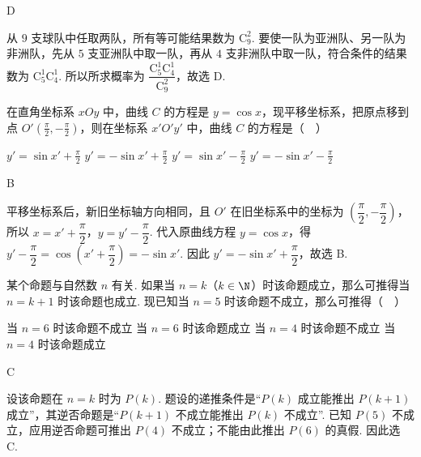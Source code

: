\begin{answer}
D
\end{answer}

\begin{solution}
从 \(9\) 支球队中任取两队，所有等可能结果数为 \(\mathrm C_9^2\). 要使一队为亚洲队、另一队为非洲队，先从 \(5\) 支亚洲队中取一队，再从 \(4\) 支非洲队中取一队，符合条件的结果数为 \(\mathrm C_5^1\mathrm C_4^1\). 所以所求概率为
\(\dfrac{\mathrm C_5^1\mathrm C_4^1}{\mathrm C_9^2}\)，故选 D.
\end{solution}

\begin{problem}
在直角坐标系 \(xOy\) 中，曲线 \(C\) 的方程是 \(y = \cos x\)，现平移坐标系，把原点移到点 \(O' \left(\frac{\pi}{2}, -\frac{\pi}{2} \right)\)，则在坐标系 \(x'O'y'\) 中，曲线 \(C\) 的方程是（\(\quad\)）

\choices
    {\(y' = \sin x' + \frac{\pi}{2} \)}
    {\(y' = -\sin x' + \frac{\pi}{2} \)}
    {\(y' = \sin x' - \frac{\pi}{2} \)}
    {\(y' = -\sin x' - \frac{\pi}{2} \)}
\end{problem}

\begin{answer}
B
\end{answer}

\begin{solution}
平移坐标系后，新旧坐标轴方向相同，且 \(O'\) 在旧坐标系中的坐标为 \(\left(\dfrac\pi2,-\dfrac\pi2\right)\)，所以
\(x=x'+\dfrac\pi2\)，\(y=y'-\dfrac\pi2\). 代入原曲线方程 \(y=\cos x\)，得
\(y'-\dfrac\pi2=\cos\left(x'+\dfrac\pi2\right)=-\sin x'\). 因此 \(y'=-\sin x'+\dfrac\pi2\)，故选 B.
\end{solution}

\begin{problem}
某个命题与自然数 \(n\) 有关. 如果当 \(n = k\)（\(k \in \N\)）时该命题成立，那么可推得当 \(n = k + 1\) 时该命题也成立. 现已知当 \(n = 5\) 时该命题不成立，那么可推得（\(\quad\)）

\choices
    {当 \(n=6\) 时该命题不成立}
    {当 \(n=6\) 时该命题成立}
    {当 \(n=4\) 时该命题不成立}
    {当 \(n=4\) 时该命题成立}
\end{problem}

\begin{answer}
C
\end{answer}

\begin{solution}
设该命题在 \(n=k\) 时为 \(P(k)\). 题设的递推条件是“\(P(k)\) 成立能推出 \(P(k+1)\) 成立”，其逆否命题是“\(P(k+1)\) 不成立能推出 \(P(k)\) 不成立”. 已知 \(P(5)\) 不成立，应用逆否命题可推出 \(P(4)\) 不成立；不能由此推出 \(P(6)\) 的真假. 因此选 C.
\end{solution}

